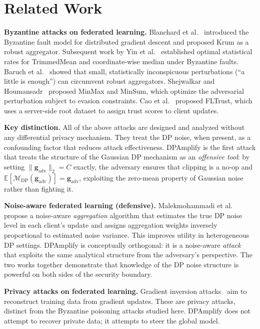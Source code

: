 \documentclass[conference]{IEEEtran}
\begin{document}
\section{Related Work}

\textbf{Byzantine attacks on federated learning.}
Blanchard et al.~\cite{blanchard2017machine} introduced
the Byzantine fault model for distributed gradient
descent and proposed Krum as a robust aggregator.
Subsequent work by Yin et al.~\cite{yin2018byzantine}
established optimal statistical rates for TrimmedMean
and coordinate-wise median under Byzantine faults.
Baruch et al.~\cite{baruch2019little} showed that
small, statistically inconspicuous perturbations
(``a little is enough'') can circumvent robust
aggregators. Shejwalkar and Houmansadr~\cite{
shejwalkar2021manipulating} proposed MinMax and MinSum,
which optimize the adversarial perturbation subject to
evasion constraints. Cao et al.~\cite{cao2022fltrust}
proposed FLTrust, which uses a server-side root dataset
to assign trust scores to client updates.

\textbf{Key distinction.} All of the above attacks are
designed and analyzed without any differential privacy
mechanism. They treat the DP noise, when present, as
a confounding factor that reduces attack effectiveness.
DPAmplify is the first attack that treats the structure
of the Gaussian DP mechanism as an \emph{offensive
tool}: by setting $\|\mathbf{g}_{\mathrm{adv}}\|_2 = C$
exactly, the adversary ensures that clipping is a
no-op and $\mathbb{E}[\mathcal{M}_{\mathrm{DP}}
(\mathbf{g}_{\mathrm{adv}})] = \mathbf{g}_{\mathrm{adv}}$,
exploiting the zero-mean property of Gaussian noise
rather than fighting it.

\textbf{Noise-aware federated learning (defensive).}
Malekmohammadi et al.~\cite{malekmohammadi2024robusthdp}
propose a noise-aware \emph{aggregation}
algorithm that estimates the true DP noise level in
each client's update and assigns aggregation weights
inversely proportional to estimated noise variance.
This improves utility in heterogeneous DP settings.
DPAmplify is conceptually orthogonal: it is a
noise-aware \emph{attack} that exploits the same
analytical structure from the adversary's perspective.
The two works together demonstrate that knowledge of
the DP noise structure is powerful on both sides of
the security boundary.

\textbf{Privacy attacks on federated learning.}
Gradient inversion attacks~\cite{zhu2019deep} aim
to reconstruct training data from gradient updates.
These are privacy attacks, distinct from the
Byzantine poisoning attacks studied here. DPAmplify
does not attempt to recover private data; it attempts
to steer the global model.
\end{document}

